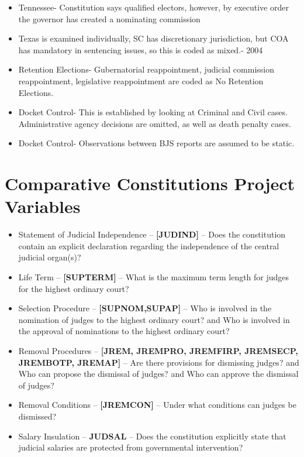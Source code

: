 \documentclass[12pt]{article}
\begin{document}
\begin{itemize}
	\item Tennessee- Constitution says qualified electors, however, by executive order the governor has created a nominating commission
	
	\item Texas is examined individually, SC has discretionary jurisdiction, but COA has mandatory in sentencing issues, so this is coded as mixed.- 2004
	
	\item Retention Elections- Gubernatorial reappointment, judicial commission reappointment, legislative reappointment are coded as No Retention Elections.
	
	\item Docket Control- This is established by looking at Criminal and Civil cases.  Administrative agency decisions are omitted, as well as death penalty cases.
	
	\item Docket Control- Observations between BJS reports are assumed to be static.
\end{itemize}

\section{Comparative Constitutions Project Variables}\label{CCPCode}
\begin{itemize}
	\item Statement of Judicial Independence -- \textbf{[JUDIND]} -- Does the constitution contain an explicit declaration regarding the independence of the central judicial organ(s)? 
	\item Life Term -- \textbf{[SUPTERM]} -- What is the maximum term length for judges for the highest ordinary court? 
	\item Selection Procedure -- \textbf{[SUPNOM,SUPAP]} -- Who is involved in the nomination of judges to the highest ordinary court? and Who is involved in the approval of nominations to the highest ordinary court? 
	\item Removal Procedures -- \textbf{[JREM, JREMPRO, JREMFIRP, JREMSECP, JREMBOTP, JREMAP]} -- Are there provisions for dismissing judges? and Who can propose the dismissal of judges? and Who can approve the dismissal of judges?
	\item Removal Conditions -- \textbf{[JREMCON]} -- Under what conditions can judges be dismissed?
	\item Salary Insulation -- \textbf{JUDSAL} -- Does the constitution explicitly state that judicial salaries are protected from governmental intervention?
\end{itemize}
\end{document}
